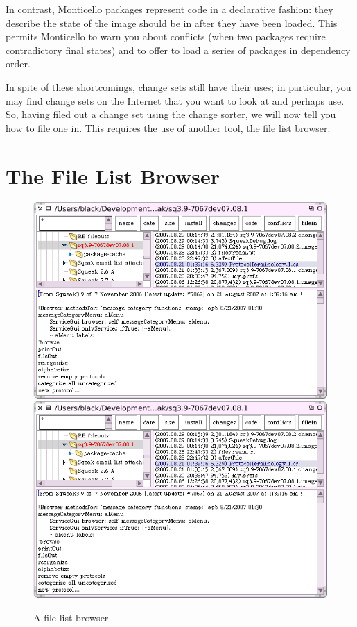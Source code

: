 \documentclass[a4paper,10pt,twoside]{book}
\begin{document}
In contrast, Monticello packages represent code in a declarative fashion: they describe the state of the image should be in after they have been loaded.
This permits Monticello to warn you about conflicts (when two packages require contradictory final states)
and to offer to load a series of packages in dependency order.

In spite of these shortcomings, change sets still have their uses; in particular, you may find change sets on the Internet that you want to look at and perhaps use.
So, having filed out a change set using the change sorter, we will now tell you how to file one in.
This requires the use of another tool, the file list browser.


\section{The File List Browser}

\begin{figure}[btp]
	\begin{center}
	\ifluluelse
		{\includegraphics[width=\textwidth]{fileList}}
		{\includegraphics[scale=0.7]{fileList}}
	\end{center}
	\caption{A file list browser}
	\label{fig:fileList}
\end{figure}
\end{document}
